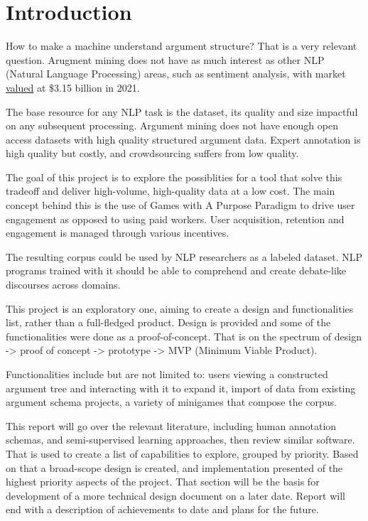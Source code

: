 \documentclass{report}
\begin{document}
\newpage

\tableofcontents

\newpage

\chapter{Introduction}
How to make a machine understand argument structure?
That is a very relevant question. Arugment mining does not have as much interest as other NLP (Natural Language Processing) areas, such as sentiment analysis, with market \href{https://www.polarismarketresearch.com/industry-analysis/sentiment-analytics-market}{valued} at \$3.15 billion in 2021.

The base resource for any NLP task is the dataset, its quality and size impactful on any subsequent processing. Argument mining does not have enough open access datasets with high quality structured argument data.  Expert annotation is high quality but costly, and crowdsourcing suffers from low quality. 

The goal of this project is to explore the possiblities for a tool that solve this tradeoff and deliver high-volume, high-quality data at a low cost. 
The main concept behind this is the use of Games with A Purpose Paradigm to drive user engagement as opposed to using paid workers. User acquisition, retention and engagement is managed through various incentives. 

The resulting corpus could be used by NLP researchers as a labeled dataset. NLP programs trained with it should be able to comprehend and create debate-like discourses across domains.

This project is an exploratory one, aiming to create a design and functionalities list, rather than a full-fledged product.
Design is provided and some of the functionalities were done as a proof-of-concept. 
That is on the spectrum of design -> proof of concept -> prototype -> MVP (Minimum Viable Product).

Functionalities include but are not limited to: users viewing a constructed argument tree and interacting with it to expand it, import of data from existing argument schema projects, a variety of minigames that compose the corpus. 

This report will go over the relevant literature, including human annotation schemas, and semi-supervised learning approaches, then review similar software. That is used to create a list of capabilities to explore, grouped by priority. Based on that a broad-scope design is created, and implementation presented of the highest priority aspects of the project.
That section will be the basis for development of a more technical design document on a later date.
Report will end with a description of achievements to date and plans for the future.
\end{document}
